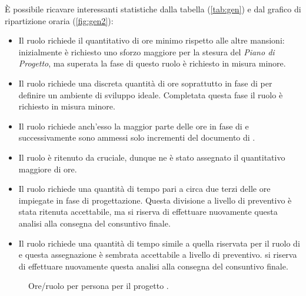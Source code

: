 È possibile ricavare interessanti statistiche dalla tabella (\ref{tab:gen}) e dal grafico di ripartizione oraria (\ref{fig:gen2}): %
\begin{itemize}
\item Il ruolo {\Rx} richiede il quantitativo di ore minimo rispetto alle altre mansioni: inizialmente è richiesto uno sforzo maggiore per la stesura del \emph{Piano di Progetto}, ma superata la fase di {\AR} questo ruolo è richiesto in misura minore.
\item Il ruolo {\AMx} richiede una discreta quantità di ore soprattutto in fase di {\AR} per definire un ambiente di sviluppo ideale. Completata questa fase il ruolo è richiesto in misura minore.
\item Il ruolo {\ANx} richiede anch'esso la maggior parte delle ore in fase di {\AR} e successivamente sono ammessi solo incrementi del documento di {\AR}.
\item Il ruolo {\PJx} è ritenuto da {\hx} cruciale, dunque ne è stato assegnato il quantitativo maggiore di ore.
\item Il ruolo {\PGx} richiede una quantità di tempo pari a circa due terzi delle ore impiegate in fase di progettazione. Questa divisione a livello di preventivo è stata ritenuta accettabile, ma {\hx} si riserva di effettuare nuovamente questa analisi alla consegna del consuntivo finale.
\item Il ruolo {\Vx} richiede una quantità di tempo simile a quella riservata per il ruolo di {\PGx} e questa assegnazione è sembrata accettabile a livello di preventivo. {\hx} si riserva di effettuare nuovamente questa analisi alla consegna del consuntivo finale.
\end{itemize}



\pagebreak

\begin{figure}[H]
\caption{Ore/ruolo per persona per il progetto \proj{}.}
\label{fig:gen1}

\end{figure}

